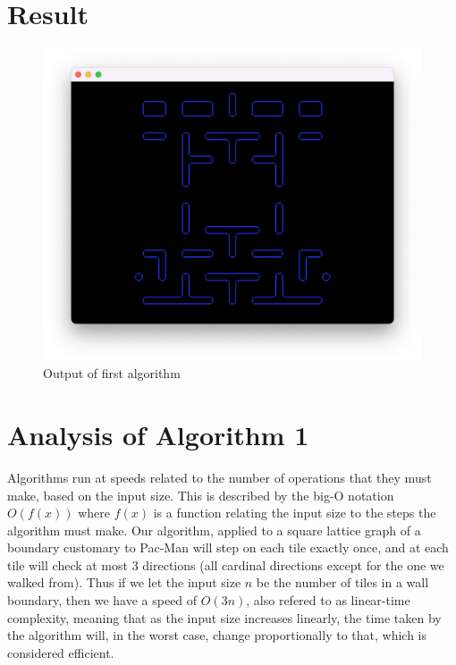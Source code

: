 \section{Result}
\begin{figure}[H]
\centering
\includegraphics[width=0.8\linewidth]{Image-8.png}
\caption {Output of first algorithm\autocite{myself}}\label{FirstOutput}
\end{figure}

\section{Analysis of Algorithm 1}
Algorithms run at speeds related to the number of operations that they must make, based on the input size. This is described by the big-O notation $O(f(x))$ where $f(x)$ is a function relating the input size to the steps the algorithm must make. Our algorithm, applied to a square lattice graph of a boundary customary to Pac-Man will step on each tile exactly once, and at each tile will check at most 3 directions (all cardinal directions except for the one we walked from). Thus if we let the input size $n$ be the number of tiles in a wall boundary, then we have a speed of $O(3n)$, also refered to as linear-time complexity, meaning that as the input size increases linearly, the time taken by the algorithm will, in the worst case, change proportionally to that, which is considered efficient. 

